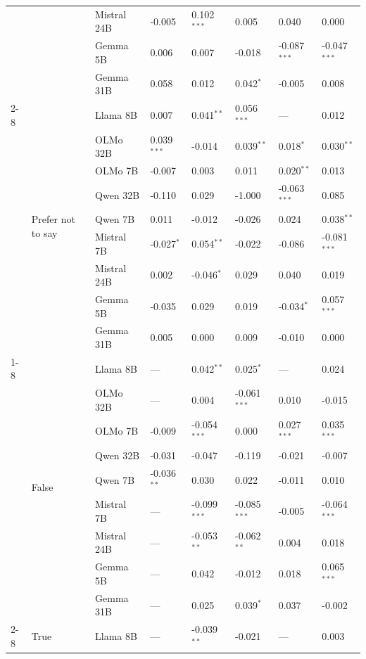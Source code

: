 \begin{longtable}[t]{llllllll}
 &  & Mistral 24B & -0.005 & 0.102$^{***}$ & 0.005 & 0.040 & 0.000 \\
 &  & Gemma 5B & 0.006 & 0.007 & -0.018 & -0.087$^{***}$ & -0.047$^{***}$ \\
 &  & Gemma 31B & 0.058 & 0.012 & 0.042$^{*}$ & -0.005 & 0.008 \\
\cline{2-8}
 & \multirow[t]{9}{*}{Prefer not to say} & Llama 8B & 0.007 & 0.041$^{**}$ & 0.056$^{***}$ & --- & 0.012 \\
 &  & OLMo 32B & 0.039$^{***}$ & -0.014 & 0.039$^{**}$ & 0.018$^{*}$ & 0.030$^{**}$ \\
 &  & OLMo 7B & -0.007 & 0.003 & 0.011 & 0.020$^{**}$ & 0.013 \\
 &  & Qwen 32B & -0.110 & 0.029 & -1.000 & -0.063$^{***}$ & 0.085 \\
 &  & Qwen 7B & 0.011 & -0.012 & -0.026 & 0.024 & 0.038$^{**}$ \\
 &  & Mistral 7B & -0.027$^{*}$ & 0.054$^{**}$ & -0.022 & -0.086 & -0.081$^{***}$ \\
 &  & Mistral 24B & 0.002 & -0.046$^{*}$ & 0.029 & 0.040 & 0.019 \\
 &  & Gemma 5B & -0.035 & 0.029 & 0.019 & -0.034$^{*}$ & 0.057$^{***}$ \\
 &  & Gemma 31B & 0.005 & 0.000 & 0.009 & -0.010 & 0.000 \\
\cline{1-8} \cline{2-8}
\multirow[t]{30}{*}{Seen Toxicity} & \multirow[t]{9}{*}{False} & Llama 8B & --- & 0.042$^{**}$ & 0.025$^{*}$ & --- & 0.024 \\
 &  & OLMo 32B & --- & 0.004 & -0.061$^{***}$ & 0.010 & -0.015 \\
 &  & OLMo 7B & -0.009 & -0.054$^{***}$ & 0.000 & 0.027$^{***}$ & 0.035$^{***}$ \\
 &  & Qwen 32B & -0.031 & -0.047 & -0.119 & -0.021 & -0.007 \\
 &  & Qwen 7B & -0.036$^{**}$ & 0.030 & 0.022 & -0.011 & 0.010 \\
 &  & Mistral 7B & --- & -0.099$^{***}$ & -0.085$^{***}$ & -0.005 & -0.064$^{***}$ \\
 &  & Mistral 24B & --- & -0.053$^{**}$ & -0.062$^{**}$ & 0.004 & 0.018 \\
 &  & Gemma 5B & --- & 0.042 & -0.012 & 0.018 & 0.065$^{***}$ \\
 &  & Gemma 31B & --- & 0.025 & 0.039$^{*}$ & 0.037 & -0.002 \\
\cline{2-8}
 & \multirow[t]{9}{*}{True} & Llama 8B & --- & -0.039$^{**}$ & -0.021 & --- & 0.003 \\

\end{longtable}
